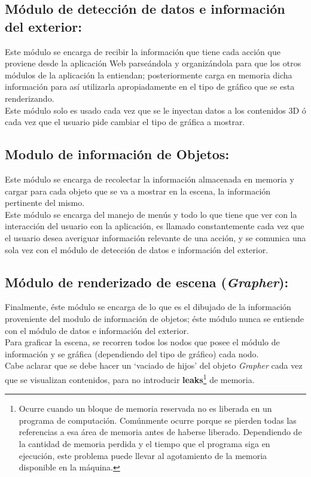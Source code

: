 \subsection{Módulo de detección de datos e información del exterior:}
Este módulo se encarga de recibir la información que tiene cada acción que proviene desde la aplicación Web parseándola y organizándola para que los otros módulos de la aplicación la entiendan; posteriormente carga en memoria dicha información para así utilizarla apropiadamente en el tipo de gráfico que se esta renderizando.\\

Este módulo solo es usado cada vez que se le inyectan datos a los contenidos 3D ó cada vez que el usuario pide cambiar el tipo de gráfica a mostrar.\\

\subsection{Modulo de información de Objetos:}
Este módulo se encarga de recolectar la información almacenada en memoria y cargar para cada objeto que se va a mostrar en la escena, la información pertinente del mismo.\\

Este módulo se encarga del manejo de menús y todo lo que tiene que ver con la interacción del usuario con la aplicación, es llamado constantemente cada vez que el usuario desea averiguar información relevante de una acción, y  se comunica una sola vez con el módulo de detección de datos e información del exterior.\\

\subsection{Módulo de renderizado de escena (\emph{Grapher}):}

Finalmente, éste módulo se encarga de lo que es el dibujado de la información proveniente del modulo de información de objetos; éste módulo nunca se entiende con el módulo de datos e información del exterior.\\
 
Para graficar la escena, se recorren todos los nodos que posee el módulo de información y se gráfica (dependiendo del tipo de gráfico) cada nodo.\\


Cabe aclarar que se debe hacer un `vaciado de hijos' del objeto \emph{Grapher} cada vez que se visualizan contenidos, para no introducir \textbf{leaks}\footnote{Ocurre cuando un bloque de memoria reservada no es liberada en un programa de computación. Comúnmente ocurre porque se pierden todas las referencias a esa área de memoria antes de haberse liberado. Dependiendo de la cantidad de memoria perdida y el tiempo que el programa siga en ejecución, este problema puede llevar al agotamiento de la memoria disponible en la máquina.} de memoria.\\



